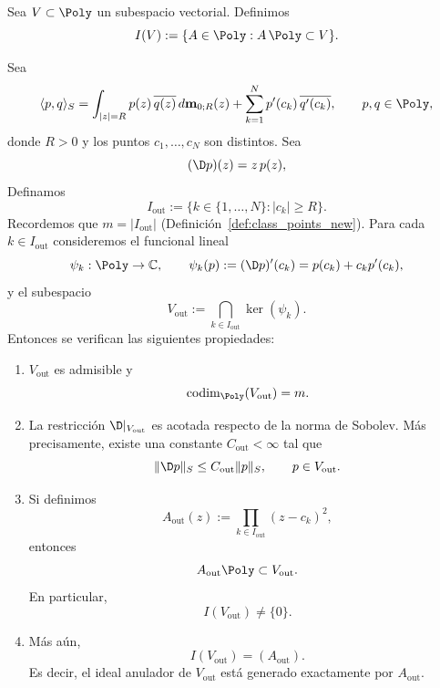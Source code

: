 \begin{defn}
	Sea $V\subset \Poly$ un subespacio vectorial. Definimos
	\[
		I(V):=\{A\in \Poly: A\,\Poly\subset V\}.
	\]
\end{defn}

\begin{thm}
	\label{thm:Vout_anulador}
	Sea
	\[
		\langle p,q\rangle_S
		=
		\int_{|z|=R} p(z)\,\overline{q(z)}\,d\mathbf{m}_{0;R}(z)
		+
		\sum_{k=1}^N p'(c_k)\,\overline{q'(c_k)},
		\qquad p,q\in \Poly,
	\]
	donde $R>0$ y los puntos $c_1,\dots,c_N$ son distintos. Sea
	\[
		(\D p)(z)=z\,p(z),
	\]
	Definamos
	\[
		I_{\mathrm{out}}:=\{k\in\{1,\dots,N\}: |c_k|\ge R\}.
	\]
	Recordemos que $m=|I_{\mathrm{out}}|$ (Definición~\ref{def:class_points_new}).
	Para cada $k\in I_{\mathrm{out}}$ consideremos el funcional lineal
	\[
		\psi_k:\Poly\to\mathbb C,
		\qquad
		\psi_k(p):=(\D p)'(c_k)=p(c_k)+c_kp'(c_k),
	\]
	y el subespacio
	\[
		V_{\mathrm{out}}:=\bigcap_{k\in I_{\mathrm{out}}}\ker(\psi_k).
	\]
	Entonces se verifican las siguientes propiedades:

	\begin{enumerate}
		\item $V_{\mathrm{out}}$ es admisible y
		      \[
			      \operatorname{codim}_{\Poly}(V_{\mathrm{out}})=m.
		      \]

		\item La restricción $\D|_{V_{\mathrm{out}}}$ es acotada respecto de la norma
		      de Sobolev. Más precisamente, existe una constante $C_{\mathrm{out}}<\infty$ tal que
		      \[
			      \|\D p\|_S\le C_{\mathrm{out}}\|p\|_S,
			      \qquad p\in V_{\mathrm{out}}.
		      \]

		\item Si definimos
		      \[
			      A_{\mathrm{out}}(z):=\prod_{k\in I_{\mathrm{out}}}(z-c_k)^2,
		      \]
		      entonces
		      \[
			      A_{\mathrm{out}}\Poly\subset V_{\mathrm{out}}.
		      \]
		      En particular,
		      \[
			      I(V_{\mathrm{out}})\neq \{0\}.
		      \]

		\item Más aún,
		      \[
			      I(V_{\mathrm{out}})=(A_{\mathrm{out}}).
		      \]
		      Es decir, el ideal anulador de $V_{\mathrm{out}}$ está generado exactamente por
		      $A_{\mathrm{out}}$.
	\end{enumerate}
\end{thm}

